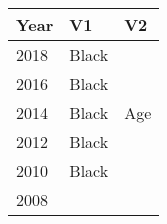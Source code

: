 \begin{tabular}{lll}
  \toprule
Year & V1 & V2 \\ 
  \midrule
2018 & Black &  \\ 
  2016 & Black &  \\ 
  2014 & Black & Age \\ 
  2012 & Black &  \\ 
  2010 & Black &  \\ 
  2008 &  &  \\ 
   \bottomrule
\end{tabular}

